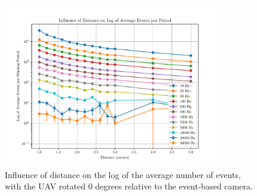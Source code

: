 
\begin{figure}[H]
    \centering
    \includegraphics[width=0.85\textwidth]{./fig/semestral/distlog.pdf}
    \caption{
        Influence of distance on the log of the average number of events, with the UAV rotated 0 degrees relative to the event-based camera.
    }
    \label{fig:dist}
\end{figure}

